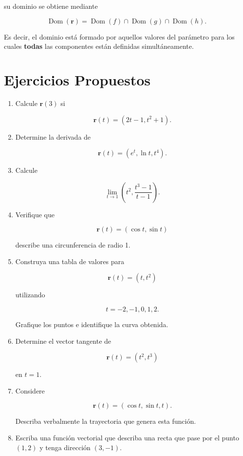 su dominio se obtiene mediante

\[
\boxed{
\operatorname{Dom}(\mathbf{r})
=
\operatorname{Dom}(f)
\cap
\operatorname{Dom}(g)
\cap
\operatorname{Dom}(h).
}
\]

Es decir, el dominio está formado por aquellos valores del parámetro para los cuales \textbf{todas} las componentes están definidas simultáneamente.



\section{Ejercicios Propuestos}

\begin{enumerate}
\item Calcule $\mathbf{r}(3)$ si

\[
\mathbf{r}(t)=\left(2t-1,t^{2}+1\right).
\]

\item Determine la derivada de

\[
\mathbf{r}(t)=
\left(
e^{t},
\ln t,
t^{4}
\right).
\]

\item Calcule

\[
\lim_{t\to1}
\left(
t^{2},
\frac{t^{3}-1}{t-1}
\right).
\]

\item Verifique que

\[
\mathbf{r}(t)=
(\cos t,\sin t)
\]

describe una circunferencia de radio 1.

\item Construya una tabla de valores para

\[
\mathbf{r}(t)=
(t,t^{2})
\]

utilizando

\[
t=-2,-1,0,1,2.
\]

Grafique los puntos e identifique la curva obtenida.

\item Determine el vector tangente de

\[
\mathbf{r}(t)=
(t^{2},t^{3})
\]

en $t=1$.

\item Considere

\[
\mathbf{r}(t)=
(\cos t,\sin t,t).
\]

Describa verbalmente la trayectoria que genera esta función.

\item Escriba una función vectorial que describa una recta que pase por el punto $(1,2)$ y tenga dirección $(3,-1)$.
\end{enumerate}
